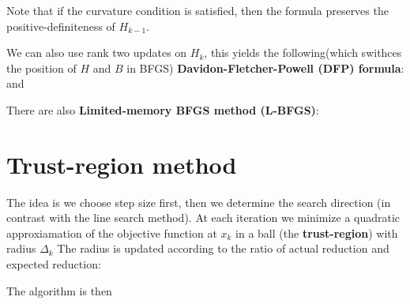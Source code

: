 \documentclass[a4paper]{mynotes}
\begin{document}
Note that if the curvature condition is satisfied, then the formula preserves the positive-definiteness of $H_{k-1}$.

We can also use rank two updates on $H_k$, this yields the following(which swithces the position of $H$ and $B$ in BFGS) \textbf{Davidon-Fletcher-Powell (DFP) formula}:
and 

There are also \textbf{ Limited-memory BFGS method (L-BFGS)}:

\section{Trust-region method}
The idea is we choose step size first, then we determine the search direction (in contrast with the line search method). At each iteration we minimize a quadratic approxiamation
of the objective function at $x_k$ in a ball (the \textbf{trust-region}) with radius $\Delta_k$   
The radius is updated according to the ratio of actual reduction and expected reduction:

The algorithm is then
\end{document}

